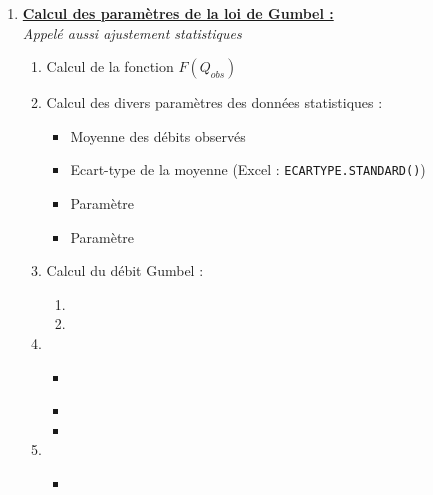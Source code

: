 \begin{enumerate}
\begin{enumerate}
    \end{enumerate}
    \bigskip
    \item \textbf{\underline{Calcul des paramètres de la loi de Gumbel :}} \\
    \textit{Appelé aussi ajustement statistiques} 
    \begin{enumerate}
        \item Calcul de la fonction $F(Q_{obs})$
        \item Calcul des divers paramètres des données statistiques :
        \begin{itemize}
            \item Moyenne des débits observés 
            \item Ecart-type de la moyenne  (Excel : \texttt{ECARTYPE.STANDARD()})
            \item Paramètre 
            \item Paramètre 
        \end{itemize}
        \item Calcul du débit Gumbel :
        \begin{enumerate}
            \item {}
            \item {}
        \end{enumerate}
        \item {}
        \begin{itemize}
            \item {} \\
            \item {}
            \item {}
        \end{itemize}
        \item {}
        \begin{itemize}
            \item {} \\

\end{itemize}
\end{enumerate}
\end{enumerate}
